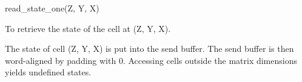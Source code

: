 

\format
read\_state\_one(Z, Y, X)

\purpose

To retrieve the state of the cell at (Z, Y, X).

\description

The state of cell (Z, Y, X) is put into the send buffer.
The send buffer is then word-aligned by padding with 0.
Accessing cells outside the matrix dimensions yields undefined states.
